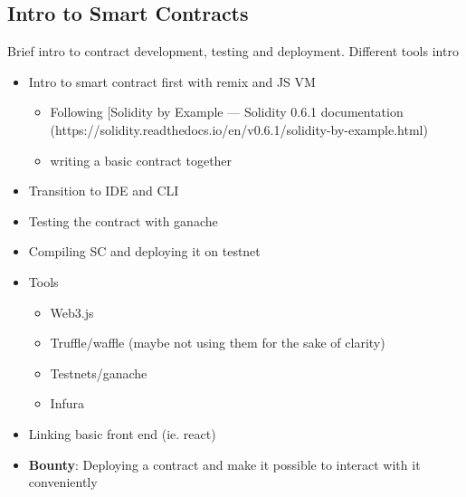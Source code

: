 \subsection{Intro to Smart Contracts}
Brief intro to contract development, testing and deployment. Different tools intro
\begin{itemize}
    \item Intro to smart contract first with remix and JS VM
    \begin{itemize}
        \item Following [Solidity by Example — Solidity 0.6.1 documentation\\(https://solidity.readthedocs.io/en/v0.6.1/solidity-by-example.html)
        \item writing a basic contract together 
    \end{itemize}
    \item Transition to IDE and CLI
    \item Testing the contract with ganache
    \item Compiling SC and deploying it on testnet
    \item Tools
    \begin{itemize}
        \item Web3.js
        \item Truffle/waffle (maybe not using them for the sake of clarity)
        \item Testnets/ganache
        \item Infura
    \end{itemize}
    \item Linking basic front end (ie. react) 
    \item \textbf{Bounty}: Deploying a contract and make it possible to interact with it conveniently
\end{itemize}